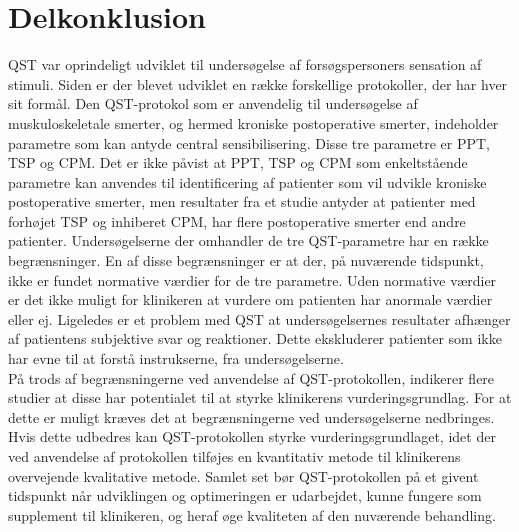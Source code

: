 \section{Delkonklusion}
QST var oprindeligt udviklet til undersøgelse af forsøgspersoners sensation af stimuli. Siden er der blevet udviklet en række forskellige protokoller, der har hver sit formål. Den QST-protokol som er anvendelig til undersøgelse af muskuloskeletale smerter, og hermed kroniske postoperative smerter, indeholder parametre som kan antyde central sensibilisering. Disse tre parametre er PPT, TSP og CPM. Det er ikke påvist at PPT, TSP og CPM som enkeltstående parametre kan anvendes til identificering af patienter som vil udvikle kroniske postoperative smerter, men resultater fra et studie antyder at patienter med forhøjet TSP og inhiberet CPM, har flere postoperative smerter end andre patienter. Undersøgelserne der omhandler de tre QST-parametre har en række begrænsninger. En af disse begrænsninger er at der, på nuværende tidspunkt, ikke er fundet normative værdier for de tre parametre. Uden normative værdier er det ikke muligt for klinikeren at vurdere om patienten har anormale værdier eller ej. Ligeledes er et problem med QST at undersøgelsernes resultater afhænger af patientens subjektive svar og reaktioner. Dette ekskluderer patienter som ikke har evne til at forstå instrukserne, fra undersøgelserne. \\
På trods af begrænsningerne ved anvendelse af QST-protokollen, indikerer flere studier at disse har potentialet til at styrke klinikerens vurderingsgrundlag. For at dette er muligt kræves det at begrænsningerne ved undersøgelserne nedbringes. Hvis dette udbedres kan QST-protokollen styrke vurderingsgrundlaget, idet der ved anvendelse af protokollen tilføjes en kvantitativ metode til klinikerens overvejende kvalitative metode. Samlet set bør QST-protokollen på et givent tidspunkt når udviklingen og optimeringen er udarbejdet, kunne fungere som supplement til klinikeren, og heraf øge kvaliteten af den nuværende behandling.



